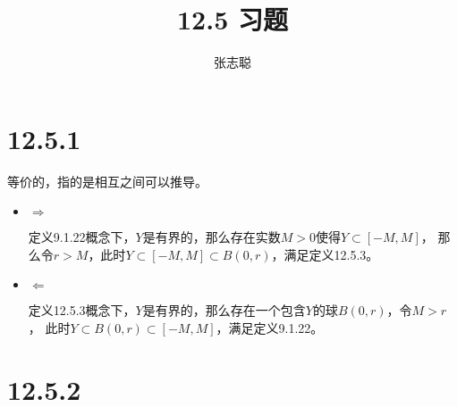 \documentclass{article}
\begin{document}
\title{12.5 习题}
\author{张志聪}
\maketitle

\section*{12.5.1}

等价的，指的是相互之间可以推导。

\begin{itemize}
  \item $\Rightarrow$

        定义9.1.22概念下，$Y$是有界的，那么存在实数$M > 0$使得$Y \subset [-M, M]$，
        那么令$r > M$，此时$Y \subset [-M, M] \subset B(0, r)$，满足定义12.5.3。

  \item $\Leftarrow$

        定义12.5.3概念下，$Y$是有界的，那么存在一个包含$Y$的球$B(0, r)$，令$M > r$，
        此时$Y \subset B(0, r) \subset [-M, M]$，满足定义9.1.22。

\end{itemize}

\section*{12.5.2}
\end{document}
